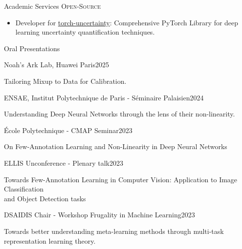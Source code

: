\documentclass{resume} %
\begin{document}
\begin{rSection}{Academic Services}
\textsc{Open-Source}
\begin{itemize}[label=$\cdot$]
    \item Developer for \href{https://github.com/ENSTA-U2IS/torch-uncertainty}{torch-uncertainty}: Comprehensive PyTorch Library for deep learning uncertainty quantification techniques. 
\end{itemize}

    
\end{rSection}
    
    
    \begin{rSection}{Oral Presentations}

    \begin{rSubsection}{Noah's Ark Lab, Huawei Paris}{2025}{}{}
        \item[] Tailoring Mixup to Data for Calibration.
    \end{rSubsection}

    \begin{rSubsection}{ENSAE, Institut Polytechnique de Paris - Séminaire Palaisien}{2024}{}{}
        \item[] Understanding Deep Neural Networks through the lens of their non-linearity.
    \end{rSubsection}

    \begin{rSubsection}{École Polytechnique - CMAP Seminar}{2023}{}{}
        \item[] On Few-Annotation Learning and Non-Linearity in Deep Neural Networks
    \end{rSubsection}

    \begin{rSubsection}{ELLIS Unconference - Plenary talk}{2023}{}{}
        \item[] Towards Few-Annotation Learning in Computer Vision: Application to Image Classification \\ and Object Detection tasks
    \end{rSubsection}

    \begin{rSubsection}{DSAIDIS Chair - Workshop Frugality in Machine Learning}{2023}{}{}
        \item[] Towards better understanding meta-learning methods through multi-task representation learning theory.
    \end{rSubsection}


\end{rSection}
\end{document}
